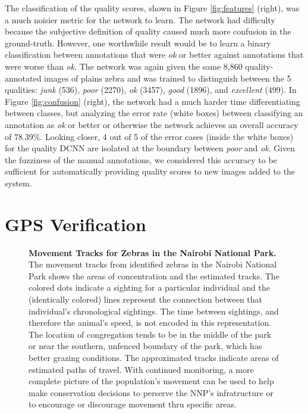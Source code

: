 The classification of the quality scores, shown in Figure \ref{fig:features} (right), was a much noisier metric for the network to learn.  The network had difficulty because the subjective definition of quality caused much more confusion in the ground-truth.  However, one worthwhile result would be to learn a binary classification between annotations that were \textit{ok} or better against annotations that were worse than \textit{ok}.  The network was again given the same 8,860 quality-annotated images of plains zebra and was trained to distinguish between the 5 qualities: \textit{junk} (536), \textit{poor} (2270), \textit{ok} (3457), \textit{good} (1896), and \textit{excellent} (499).  In Figure \ref{fig:confusion} (right), the network had a much harder time differentiating between classes, but analyzing the error rate (white boxes) between classifying an annotation as \textit{ok} or better or otherwise the network achieves an overall accuracy of 78.39\%.  Looking closer, 4 out of 5 of the error cases (inside the white boxes) for the quality DCNN are isolated at the boundary between \textit{poor} and \textit{ok}.  Given the fuzziness of the manual annotations, we considered this accuracy to be sufficient for automatically providing quality scores to new images added to the system.

\section{GPS Verification}

\begin{figure}[!htb]%
    \centering
        \caption[Movement Tracks for Zebras in the Nairobi National Park]{\textbf{Movement Tracks for Zebras in the Nairobi National Park.}  The movement tracks from identified zebras in the Nairobi National Park shows the areas of concentration and the estimated tracks.  The colored dots indicate a sighting for a particular individual and the (identically colored) lines represent the connection between that individual's chronological sightings.  The time between sightings, and therefore the animal's speed, is not encoded in this representation.  The location of congregation tends to be in the middle of the park or near the southern, unfenced boundary of the park, which has better grazing conditions.  The approximated tracks indicate areas of estimated paths of travel.  With continued monitoring, a more complete picture of the population's movement can be used to help make conservation decisions to perserve the NNP's infratructure or to encourage or discourage movement thru specific areas.}
        \label{fig:tracks}
\end{figure}

